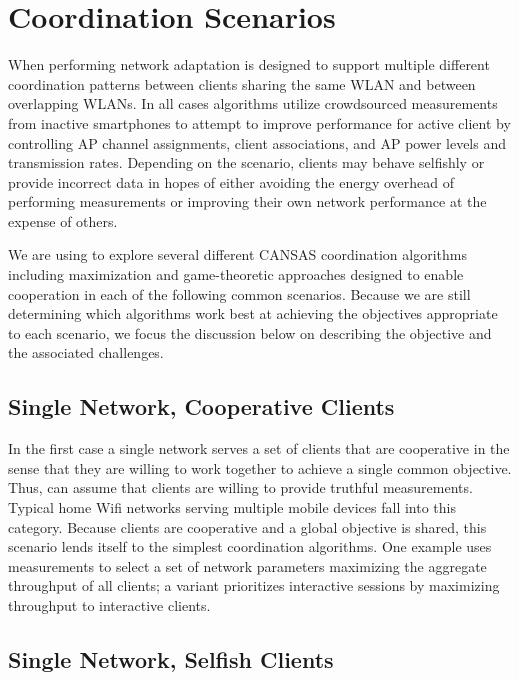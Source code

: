 \section{Coordination Scenarios}
\label{sec-algorithms}

When performing network adaptation \PS{} is designed to support multiple
different coordination patterns between clients sharing the same WLAN and
between overlapping WLANs. In all cases \PS{} algorithms utilize crowdsourced
measurements from inactive smartphones to attempt to improve performance for
active client by controlling AP channel assignments, client associations, and
AP power levels and transmission rates. Depending on the scenario, clients
may behave selfishly or provide incorrect data in hopes of either avoiding
the energy overhead of performing measurements or improving their own network
performance at the expense of others.

We are using \PS{} to explore several different CANSAS coordination
algorithms including maximization and game-theoretic approaches designed to
enable cooperation in each of the following common scenarios. Because we are
still determining which algorithms work best at achieving the objectives
appropriate to each scenario, we focus the discussion below on describing the
objective and the associated challenges.

\subsection{Single Network, Cooperative Clients}

In the first case a single network serves a set of clients that are
cooperative in the sense that they are willing to work together to achieve a
single common objective. Thus, \PS{} can assume that clients are willing to
provide truthful measurements. Typical home Wifi networks serving multiple
mobile devices fall into this category. Because clients are cooperative and a
global objective is shared, this scenario lends itself to the simplest
coordination algorithms. One example uses \PS{} measurements to select a set
of network parameters maximizing the aggregate throughput of all clients; a
variant prioritizes interactive sessions by maximizing throughput to
interactive clients.

\subsection{Single Network, Selfish Clients}

